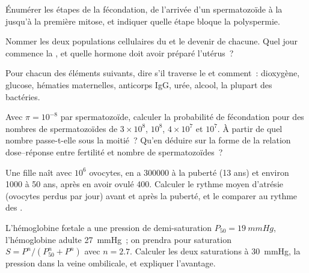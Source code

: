 \begin{exercise}[$\star$]\label{exo:b2:mammal-reproduction:2}
Énumérer les étapes de la fécondation, de l'arrivée d'un spermatozoïde
à la  jusqu'à la première mitose, et indiquer quelle étape
bloque la polyspermie.
\end{exercise}

\begin{exercise}[$\star$]\label{exo:b2:mammal-reproduction:3}
Nommer les deux populations cellulaires du  et le devenir de
chacune. Quel jour commence la , et quelle hormone doit avoir
préparé l'utérus~?
\end{exercise}

\begin{exercise}[$\star$]\label{exo:b2:mammal-reproduction:4}
Pour chacun des éléments suivants, dire s'il traverse le  et
comment~: dioxygène, glucose, hématies maternelles, anticorps IgG, urée,
alcool, la plupart des bactéries.
\end{exercise}

\begin{exercise}[$\star\star$]\label{exo:b2:mammal-reproduction:5}
Avec $\pi = 10^{-8}$ par spermatozoïde, calculer la probabilité de
fécondation pour des nombres de spermatozoïdes de $3\times 10^{8}$,
$10^{8}$,
$4\times 10^{7}$ et $10^{7}$. À partir de quel nombre passe-t-elle sous
la moitié~? Qu'en déduire sur la forme de la relation dose--réponse
entre fertilité et nombre de spermatozoïdes~?
\end{exercise}

\begin{exercise}[$\star\star$]\label{exo:b2:mammal-reproduction:6}
Une fille naît avec $10^{6}$ ovocytes, en a \num{300000} à la puberté
(13 ans) et environ \num{1000} à 50 ans, après en avoir ovulé \num{400}.
Calculer le rythme moyen d'atrésie (ovocytes perdus par jour) avant et
après la puberté, et le comparer au rythme des .
\end{exercise}

\begin{exercise}[$\star\star$]\label{exo:b2:mammal-reproduction:7}
L'hémoglobine fœtale a une pression de demi-saturation $P_{50} =
\qty{19}{mmHg}$, l'hémoglobine adulte \qty{27}{mmHg}~; on prendra pour
saturation $S = P^{n}/(P_{50}^{n} + P^{n})$ avec $n = 2.7$. Calculer
les deux saturations à \qty{30}{mmHg}, la pression dans la veine
ombilicale, et expliquer l'avantage.
\end{exercise}

